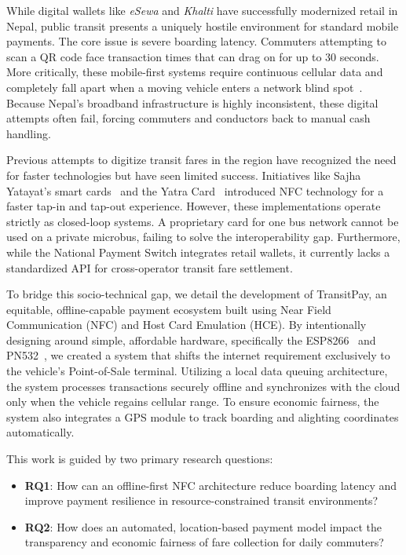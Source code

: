 \documentclass[manuscript,review,anonymous]{acmart}
\begin{document}
While digital wallets like \textit{eSewa} and \textit{Khalti} have successfully modernized retail in Nepal, public transit presents a uniquely hostile environment for standard mobile payments. The core issue is severe boarding latency. Commuters attempting to scan a QR code face transaction times that can drag on for up to 30 seconds. More critically, these mobile-first systems require continuous cellular data and completely fall apart when a moving vehicle enters a network blind spot~\cite{gupta2022m}. Because Nepal's broadband infrastructure is highly inconsistent, these digital attempts often fail, forcing commuters and conductors back to manual cash handling.

Previous attempts to digitize transit fares in the region have recognized the need for faster technologies but have seen limited success. Initiatives like Sajha Yatayat's smart cards~\cite{annapurnaexpress2026article} and the Yatra Card~\cite{fintech2023yatra} introduced NFC technology for a faster tap-in and tap-out experience. However, these implementations operate strictly as closed-loop systems. A proprietary card for one bus network cannot be used on a private microbus, failing to solve the interoperability gap. Furthermore, while the National Payment Switch integrates retail wallets, it currently lacks a standardized API for cross-operator transit fare settlement.

To bridge this socio-technical gap, we detail the development of TransitPay, an equitable, offline-capable payment ecosystem built using Near Field Communication (NFC) and Host Card Emulation (HCE). By intentionally designing around simple, affordable hardware, specifically the ESP8266~\cite{esp8266soc} and PN532~\cite{nxp2016pn532}, we created a system that shifts the internet requirement exclusively to the vehicle's Point-of-Sale terminal. Utilizing a local data queuing architecture, the system processes transactions securely offline and synchronizes with the cloud only when the vehicle regains cellular range. To ensure economic fairness, the system also integrates a GPS module to track boarding and alighting coordinates automatically.

This work is guided by two primary research questions:
\begin{itemize}
  \item \textbf{RQ1}: How can an offline-first NFC architecture reduce boarding latency and improve payment resilience in resource-constrained transit environments?

  \item \textbf{RQ2}: How does an automated, location-based payment model impact the transparency and economic fairness of fare collection for daily commuters?
\end{itemize}
\end{document}
